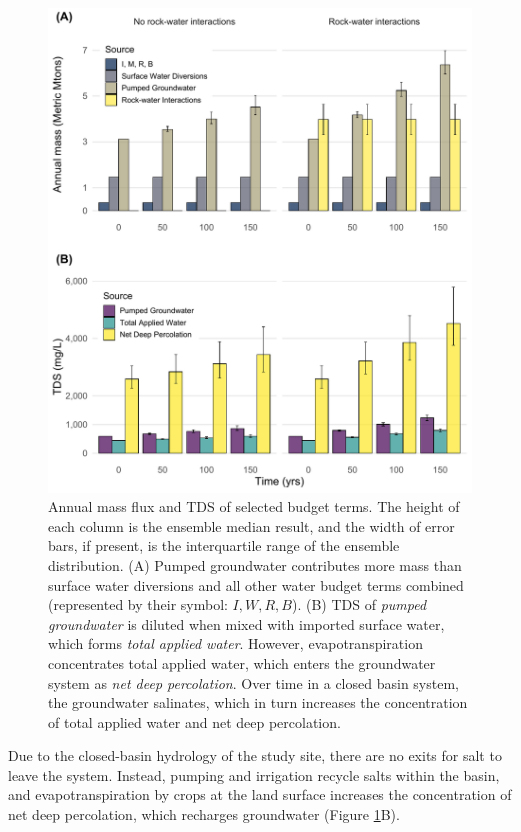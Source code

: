 \begin{figure}[H]
	\includegraphics[width=\textwidth]{ch3_figs/p23.pdf}
	\caption{Annual mass flux and TDS of selected budget terms. The height of each column is the ensemble median result, and the width of error bars, if present, is the interquartile range of the ensemble distribution. (A) Pumped groundwater contributes more mass than surface water diversions and all other water budget terms combined (represented by their symbol: $I, W, R, B$). (B) TDS of \textit{pumped groundwater} is diluted when mixed with imported surface water, which forms \textit{total applied water}. However, evapotranspiration concentrates total applied water, which enters the groundwater system as \textit{net deep percolation}. Over time in a closed basin system, the groundwater salinates, which in turn increases the concentration of total applied water and net deep percolation. }
	\label{fig:salt_ec}
\end{figure}



Due to the closed-basin hydrology of the study site, there are no exits for salt to leave the system. Instead, pumping and irrigation recycle salts within the basin, and evapotranspiration by crops at the land surface increases the concentration of net deep percolation, which recharges groundwater (Figure \ref{fig:salt_ec}B). 

